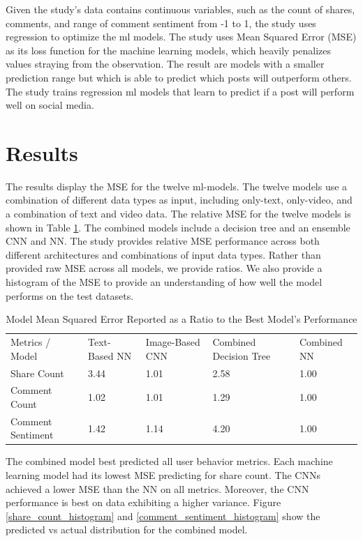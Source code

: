 \documentclass[mksc,blindrev]{informs3} %
\begin{document}
Given the study's data contains continuous variables, such as the count of shares, comments, and range of comment sentiment from -1 to 1, the study uses regression to optimize the ml models. The study uses Mean Squared Error (MSE) as its loss function for the machine learning models, which heavily penalizes values straying from the observation. The result are models with a smaller prediction range but which is able to predict which posts will outperform others. The study trains regression ml models that learn to predict if a post will perform well on social media.

\section{Results}

The results display the MSE for the twelve ml-models. The twelve models use a combination of different data types as input, including only-text, only-video, and a combination of text and video data. The relative MSE for the twelve models is shown in Table \ref{mse_ratios}. The combined models include a decision tree and an ensemble CNN and NN. The study provides relative MSE performance across both different architectures and combinations of input data types. Rather than provided raw MSE across all models, we provide ratios.  We also provide a histogram of the MSE to provide an understanding of how well the model performs on the test datasets.

\begin{table}[]
\centering
\begin{tabular}{lllll}
Metrics / Model & Text-Based NN & Image-Based CNN & Combined Decision Tree & Combined NN \\
Share Count       & 3.44 & 1.01 & 2.58 & 1.00 \\
Comment Count     & 1.02 & 1.01 & 1.29 & 1.00 \\
Comment Sentiment & 1.42 & 1.14 & 4.20 & 1.00
\end{tabular}
\caption{\label{mse_ratios}Model Mean Squared Error Reported as a Ratio to the Best Model's Performance}
\end{table}

The combined model best predicted all user behavior metrics. Each machine learning model had its lowest MSE predicting for share count. The CNNs achieved a lower MSE than the NN on all metrics. Moreover, the CNN performance is best on data exhibiting a higher variance. Figure \ref{share_count_histogram} and \ref{comment_sentiment_histogram} show the predicted vs actual distribution for the combined model.
\end{document}
